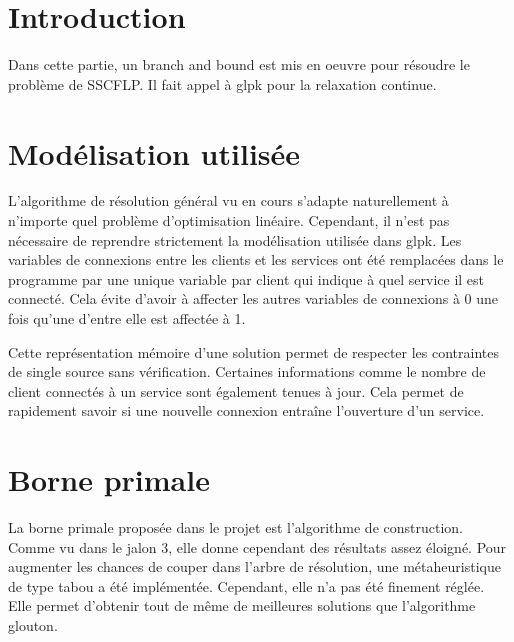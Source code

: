 \section{Introduction}

Dans cette partie, un branch and bound est mis en oeuvre pour résoudre le problème de SSCFLP.
Il fait appel à glpk pour la relaxation continue.

\section{Modélisation utilisée}

L'algorithme de résolution général vu en cours s'adapte naturellement à n'importe quel problème d'optimisation linéaire.
Cependant, il n'est pas nécessaire de reprendre strictement la modélisation utilisée dans glpk.
Les variables de connexions entre les clients et les services ont été remplacées dans le programme par une unique variable par client qui indique à quel service il est connecté. Cela évite d'avoir à affecter les autres variables de connexions à 0 une fois qu'une d'entre elle est affectée à 1. \newline

Cette représentation mémoire d'une solution permet de respecter les contraintes de single source sans vérification.
Certaines informations comme le nombre de client connectés à un service sont également tenues à jour.
Cela permet de rapidement savoir si une nouvelle connexion entraîne l'ouverture d'un service.

\section{Borne primale}

La borne primale proposée dans le projet est l'algorithme de construction.
Comme vu dans le jalon 3, elle donne cependant des résultats assez éloigné.
Pour augmenter les chances de couper dans l'arbre de résolution, une métaheuristique de type tabou a été implémentée.
Cependant, elle n'a pas été finement réglée. Elle permet d'obtenir tout de même de meilleures solutions que l'algorithme glouton. \newline

